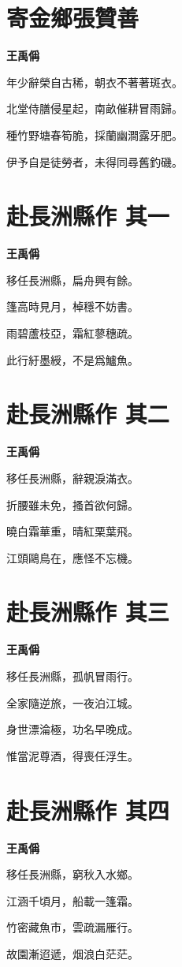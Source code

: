 \documentclass[12pt,a4paper]{ctexbook}
\begin{document}
\section{寄金鄉張贊善}
\textbf{王禹偁}\par\vspace{0.5em}
年少辭榮自古稀，朝衣不著著斑衣。\par
北堂侍膳侵星起，南畝催耕冒雨歸。\par
種竹野塘春筍脆，採蘭幽澗露牙肥。\par
伊予自是徒勞者，未得同尋舊釣磯。\par

\section{赴長洲縣作  其一}
\textbf{王禹偁}\par\vspace{0.5em}
移任長洲縣，扁舟興有餘。\par
篷高時見月，棹穩不妨書。\par
雨碧蘆枝亞，霜紅蓼穗疏。\par
此行紆墨綬，不是爲鱸魚。\par

\section{赴長洲縣作  其二}
\textbf{王禹偁}\par\vspace{0.5em}
移任長洲縣，辭親淚滿衣。\par
折腰雖未免，搔首欲何歸。\par
曉白霜華重，晴紅栗葉飛。\par
江頭鷗鳥在，應怪不忘機。\par

\section{赴長洲縣作  其三}
\textbf{王禹偁}\par\vspace{0.5em}
移任長洲縣，孤帆冒雨行。\par
全家隨逆旅，一夜泊江城。\par
身世漂淪極，功名早晚成。\par
惟當泥尊酒，得喪任浮生。\par

\section{赴長洲縣作  其四}
\textbf{王禹偁}\par\vspace{0.5em}
移任長洲縣，窮秋入水鄉。\par
江涵千頃月，船載一篷霜。\par
竹密藏魚市，雲疏漏雁行。\par
故園漸迢遞，烟浪白茫茫。\par
\end{document}
